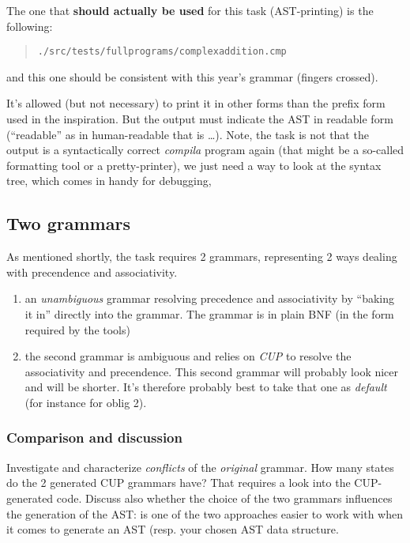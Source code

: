 \documentclass[10pt,freeform]{handout}[2014/08/13]
\begin{document}
The one that \textbf{should actually be used} for this task (AST-printing)
is the following:

\begin{quote}
  \texttt{./src/tests/fullprograms/complexaddition.cmp}  
\end{quote}

and this one should be consistent with this year's grammar (fingers
crossed).



It's allowed (but not necessary) to print it in other forms than the prefix
form used in the inspiration. But the output must indicate the AST in
readable form (``readable'' as in human-readable that is \ldots). Note, the
task is not that the output is a syntactically correct \textsl{compila}
program again (that might be a so-called formatting tool or a
pretty-printer), we just need a way to look at the syntax tree, which comes
in handy for debugging,


%
% 

\subsection{Two grammars}
\label{sec:two-grammars}


As mentioned shortly, the task requires 2 grammars, representing 2 ways
dealing with precendence and associativity.

\begin{enumerate}
\item an \emph{unambiguous} grammar resolving precedence and associativity
  by ``baking it in'' directly into the grammar. The grammar is in plain
  BNF (in the form required by the tools)
\item the second grammar is ambiguous and relies on \emph{CUP} to resolve
  the associativity and precendence. This second grammar will probably look
  nicer and will be shorter. It's therefore probably best to take that one
  as \emph{default} (for instance for oblig 2).
\end{enumerate}

\subsubsection*{Comparison and discussion}
\label{sec:comparison}

Investigate and characterize \emph{conflicts} of the \emph{original}
grammar. How many states do the 2 generated CUP grammars have? That
requires a look into the CUP-generated code. Discuss also whether the
choice of the two grammars influences the generation of the AST: is one of
the two approaches easier to work with when it comes to generate an AST
(resp. your chosen AST data structure.
\end{document}
